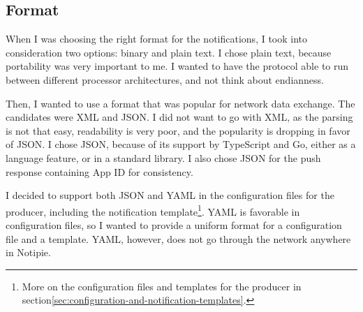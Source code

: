 \subsection{Format}\label{sec:protocol-format}

When I was choosing the right format
for the notifications,
I took into consideration two options:
binary and plain text.
I chose plain text,
because portability was very important to me.
I wanted to have the protocol able to run
between different processor architectures,
and not think about endianness.

Then, I wanted to use a format
that was popular for network data exchange.
The candidates were XML and JSON.
I did not want to go with XML,
as the parsing is not that easy,
readability is very poor,
and the popularity is dropping
in favor of JSON.
I chose JSON,
because of its support by TypeScript and Go,
either as a language feature,
or in a standard library.
I also chose JSON for the push response
containing App ID
for consistency.

I decided to support both JSON and YAML
in the configuration files for the producer,
including the notification template\footnote{
  More on the configuration files and templates
  for the producer
  in section\ref{sec:configuration-and-notification-templates}.
}.
YAML is favorable in configuration files,
so I wanted to provide a uniform
format for a configuration file
and a template.
YAML, however,
does not go through the network
anywhere in Notipie.

